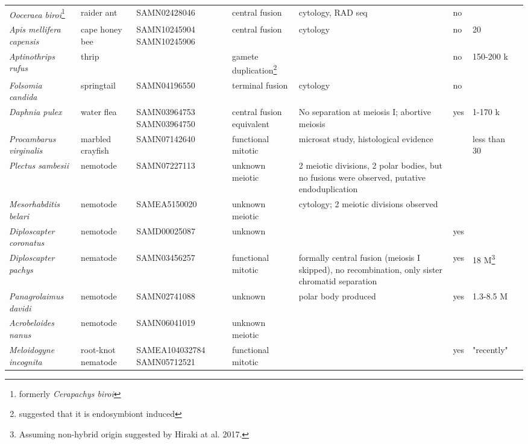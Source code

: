 \documentclass{article}
\begin{document}
\begin{longtable}[H]{ C{.13\textwidth} C{.1\textwidth} C{.12\textwidth} L{.13\textwidth} L{.199\textwidth} C{.04\textwidth} C{.082\textwidth} C{.062\textwidth}}
      \textit{Ooceraea biroi}\footnote{formerly \textit{Cerapachys biroi}} & raider ant & SAMN02428046 & central fusion & cytology, RAD seq & no & & \cite{Oxley2014} \\
      \textit{Apis mellifera capensis} & cape honey bee &  SAMN10245904 SAMN10245906 & central fusion & cytology & no & 20 & \cite{Verma1983} \\
      \textit{Aptinothrips rufus} & thrip &  & gamete duplication\footnote{suggested that it is endosymbiont induced} & & no & 150-200 k & \cite{Fontcuberta2016} \\
      \textit{Folsomia candida} & springtail & SAMN04196550 & terminal fusion\footnotemark[4] & cytology & no & & \cite{Riparbelli2006} \\
      \textit{Daphnia pulex} & water flea & SAMN03964753 SAMN03964750 & central fusion equivalent & No separation at meiosis I; abortive meiosis & yes & 1-170 k & \cite{Hiruta2010} \\
      \textit{Procambarus virginalis} & marbled crayfish & SAMN07142640 & functional mitotic & microsat study, histological evidence &  & less than 30 & \cite{Vogt2004,Martin2015,Vogt2015} \\
      \hline
      \textit{Plectus sambesii} & nemotode & SAMN07227113 & unknown meiotic & 2 meiotic divisions, 2 polar bodies, but no fusions were observed, putative endoduplication &  & & \cite{Lahl2006} \\
      \textit{Mesorhabditis belari} & nemotode & SAMEA5150020 & unknown meiotic & cytology; 2 meiotic divisions observed &  &  & \cite{grosmaire2019} \\
      \textit{Diploscapter coronatus} & nemotode & SAMD00025087 & unknown & & yes & & \cite{Lahl2006,Hiraki2017} \\
      \textit{Diploscapter pachys} & nematode & SAMN03456257 & functional mitotic & formally central fusion (meiosis I skipped), no recombination, only sister chromatid separation & yes & 18 M\footnote{Assuming non-hybrid origin suggested by Hiraki at al. 2017.} & \cite{Fradin2017} \\
      \textit{Panagrolaimus davidi} & nemotode & SAMN02741088 & unknown & polar body produced & yes & 1.3-8.5 M & \cite{Schiffer2017} \\
      \textit{Acrobeloides nanus} & nemotode & SAMN06041019 & unknown meiotic & & & & \cite{Lahl2006} \\
      \textit{Meloidogyne incognita} & root-knot nematode & SAMEA104032784 SAMN05712521 & functional mitotic & & yes & "recently" & \cite{Triantaphyllou1981, VanderBeek1998, Lunt2014} \\

\end{longtable}
\end{document}
